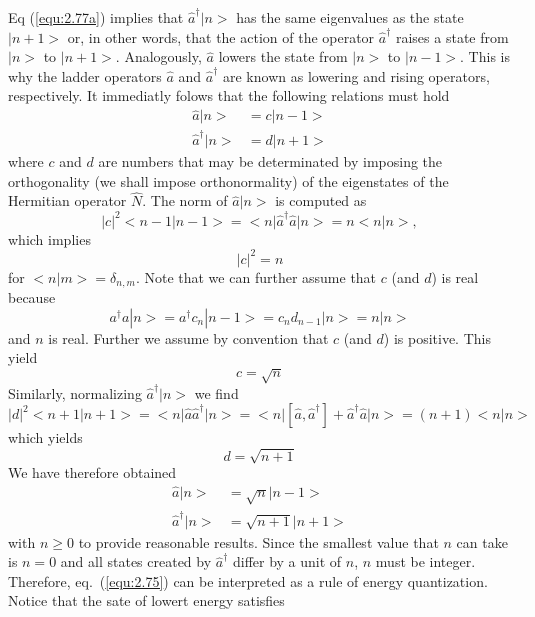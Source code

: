 Eq (\ref{equ:2.77a}) implies that $\hat{a}^{\dagger}|n>$ has
the same eigenvalues as the state $|n+1>$ or, in other
words, that the action of the operator $\hat{a}^{\dagger}$
raises a state from $|n>$ to $|n+1>$. Analogously, $\hat{a}$
lowers the state from $|n>$ to $|n-1>$. This is why the
ladder operators $\hat{a}$ and $\hat{a}^{\dagger}$ are known
as lowering and rising operators, respectively.
It immediatly folows that the following relations must hold
\begin{align}
  \hat{a}|n> &= c |n-1> \nonumber\\
  \hat{a}^{\dagger}|n> &= d |n+1> \label{equ:2.78}
\end{align}
where $c$ and $d$ are numbers that may be determinated by
imposing the orthogonality (we shall impose orthonormality)
of the eigenstates of the Hermitian operator $\hat{N}$. The
norm of $\hat{a}|n>$ is computed as
$$
|c|^2 <n-1|n-1> = <n|\hat{a}^{\dagger}\hat{a}|n> = n<n|n>,
$$
which implies
\begin{equation}
  |c|^2 = n
  \label{equ:2.79}
\end{equation}
for $<n|m> = \delta_{n,m}$. Note that we can further assume
that $c$ (and $d$) is real because
$$
a^{\dagger}a |n> = a^{\dagger} c_n | n-1> = c_n d_{n-1}|n> =
n|n>
$$
and $n$ is real. Further we assume by convention that $c$
(and $d$) is positive. This yield
\begin{equation}
  c = \sqrt{n}
  \label{equ:2.80}
\end{equation}
Similarly, normalizing $\hat{a}^{\dagger} |n>$ we find
$$
|d|^2 <n+1|n+1> = <n|\hat{a}\hat{a}^{\dagger}|n> =
<n|[\hat{a}, \hat{a}^{\dagger}] + \hat{a}^{\dagger}\hat{a} |
n>  = (n+1) <n|n>
$$
which yields
\begin{equation}
  d = \sqrt{n+1}
  \label{equ:2.81}
\end{equation}
We have therefore obtained
\begin{subequations}
  \begin{align}
    \hat{a}|n> &= \sqrt{n}|n-1> \label{equ:2.82a} \\
    \hat{a}^{\dagger}|n> &= \sqrt{n+1}|n+1> \label{equ:2.82b}
  \end{align}
\end{subequations}
with $n \geq 0$ to provide reasonable results. Since the
smallest value that $n$ can take is $n = 0$ and all states
created by $\hat{a}^{\dagger}$ differ by a unit of $n$, $n$
must be integer. Therefore, eq.~(\ref{equ:2.75}) can be
interpreted as a rule of energy quantization.
Notice that the sate of lowert energy satisfies
